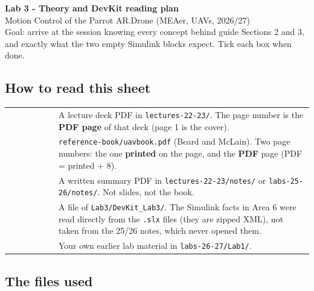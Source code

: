 \documentclass[10pt,a4paper]{article}
\newcommand{\srctag}[2]{\colorbox{#1}{\textcolor{white}{\textbf{\scriptsize\,#2\,}}}}
\newcommand{\SLIDES}{\srctag{slides}{SLIDES}}
\newcommand{\BOOK}{\srctag{book}{BOOK}}
\newcommand{\NOTES}{\srctag{notes}{NOTES}}
\newcommand{\DEVKIT}{\srctag{devkit}{DEVKIT}}
\newcommand{\LAB}{\srctag{devkit}{LAB}}
\begin{document}
{\LARGE\bfseries\color{slides} Lab 3 - Theory and DevKit reading plan}\\[0.6ex]
{\large Motion Control of the Parrot AR.Drone (MEAer, UAVs, 2026/27)}\\[0.4ex]
{\small Goal: arrive at the session knowing every concept behind guide Sections 2 and 3, and exactly what the two empty Simulink blocks expect. Tick each box when done.}

\subsection*{How to read this sheet}

\begin{tabularx}{\textwidth}{@{}l X@{}}
\SLIDES & A lecture deck PDF in \texttt{lectures-22-23/}. The page number is the \textbf{PDF page} of that deck (page 1 is the cover).\\[0.5ex]
\BOOK & \texttt{reference-book/uavbook.pdf} (Beard and McLain). Two page numbers: the one \textbf{printed} on the page, and the \textbf{PDF} page (PDF = printed + 8).\\[0.5ex]
\NOTES & A written summary PDF in \texttt{lectures-22-23/notes/} or \texttt{labs-25-26/notes/}. Not slides, not the book.\\[0.5ex]
\DEVKIT & A file of \texttt{Lab3/DevKit\_Lab3/}. The Simulink facts in Area 6 were read directly from the \texttt{.slx} files (they are zipped XML), not taken from the 25/26 notes, which never opened them.\\[0.5ex]
\LAB & Your own earlier lab material in \texttt{labs-26-27/Lab1/}.\\
\end{tabularx}

\subsection*{The files used}
\end{document}

